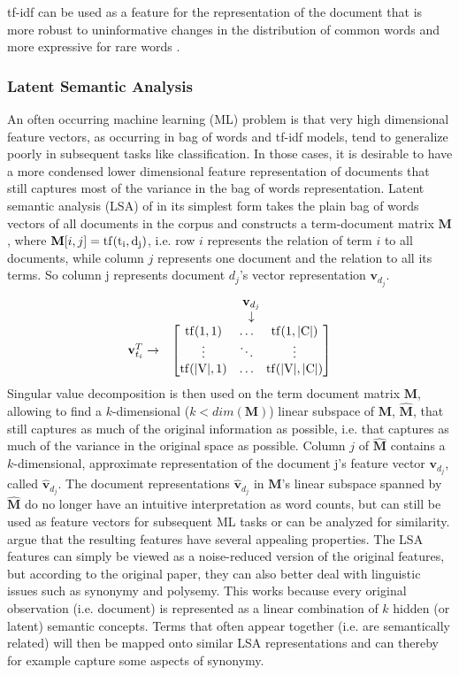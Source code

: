 tf-idf can be used as a feature for the representation of the document
that is more robust to uninformative changes in the distribution of
common words and more expressive for rare words \citep{Manning2008vect}.


\subsubsection*{Latent Semantic Analysis}

An often occurring machine learning (ML) problem is that very high dimensional
feature vectors, as occurring in bag of words and tf-idf models,
tend to generalize poorly in subsequent tasks like classification.
In those cases, it is desirable to have a more condensed lower dimensional
feature representation of documents that still captures most of the
variance in the bag of words representation. Latent semantic analysis
(LSA) of \citet{Deerwester1990} in its simplest form takes the plain bag of words
vectors of all documents in the corpus and constructs a term-document
matrix $\textbf{M}$, where $\textbf{M}[i,j]=\rm{tf}(t_{i},d_{j})$, i.e. row $i$ represents
the relation of term $i$ to all documents, while column $j$ represents
one document and the relation to all its terms. So column j represents document $d_j$'s vector representation $\textbf{v}_{d_j}$.
\[ 
\begin{matrix} & \textbf{v}_{d_j}\\
& \downarrow\\
\textbf{v}_{t_i}^{T}\rightarrow & \begin{bmatrix}\rm{tf}(1,1) & \dots & \rm{tf}(1,|C|)\\
\vdots & \ddots & \vdots\\
\rm{tf}(|V|,1) & \dots & \rm{tf}(|V|,|C|)
\end{bmatrix}
\end{matrix}
\]
Singular value decomposition is then used on the term document matrix
$\textbf{M}$, allowing to find a $k$-dimensional ($k<dim(\textbf{M})$) linear subspace
of $\textbf{M}$, $\hat{\textbf{M}}$, that still captures as much of the original information
as possible, i.e. that captures as much of the variance in the original
space as possible. Column $j$ of $\hat{\textbf{M}}$ contains a $k$-dimensional,
approximate representation of the document j's feature vector $\textbf{v}_{d_{j}}$, called $\hat{\textbf{v}}_{d_{j}}$.
The document representations $\hat{\textbf{v}}_{d_j}$ in $\textbf{M}$'s linear subspace
spanned by $\hat{\textbf{M}}$ do no longer have an intuitive interpretation
as word counts, but can still be used as feature vectors for subsequent
ML tasks or can be analyzed for similarity. \citet{Deerwester1990} argue
that the resulting features have several appealing properties. The
LSA features can simply be viewed as a noise-reduced version of the
original features, but according to the original paper, they can also
better deal with linguistic issues such as synonymy and polysemy.
This works because every original observation (i.e. document) is represented
as a linear combination of $k$ hidden (or latent) semantic concepts.
Terms that often appear together (i.e. are semantically related) will
then be mapped onto similar LSA representations and can thereby for
example capture some aspects of synonymy.

